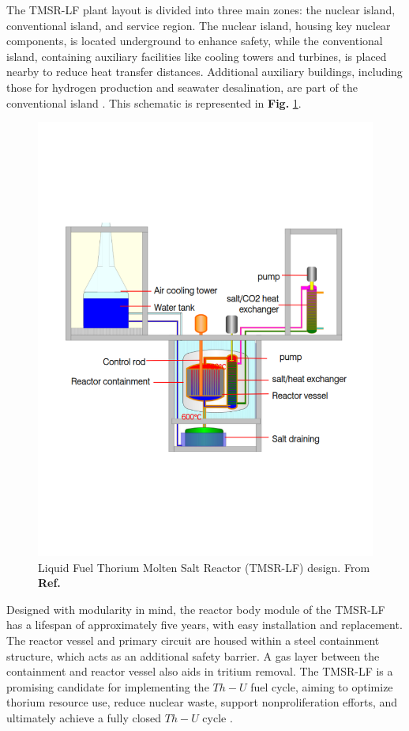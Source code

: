 The TMSR-LF plant layout is divided into three main zones: the nuclear island, conventional island, and service region. The nuclear island, housing key nuclear components, is located underground to enhance safety, while the conventional island, containing auxiliary facilities like cooling towers and turbines, is placed nearby to reduce heat transfer distances. Additional auxiliary buildings, including those for hydrogen production and seawater desalination, are part of the conventional island \cite{TMSR_book}. This schematic is represented in \textbf{Fig.} \ref{fig:TMSR-LF}.

\begin{figure}[ht]
    \centering
    \includegraphics[scale=0.5]{Kap6/Figures_Kap6/TMSR-LF_2.png}
    \caption{Liquid Fuel Thorium Molten Salt Reactor (TMSR-LF) design. From \textbf{Ref.} \cite{Xu2017}}
    \label{fig:TMSR-LF}    
\end{figure}

Designed with modularity in mind, the reactor body module of the TMSR-LF has a lifespan of approximately five years, with easy installation and replacement. The reactor vessel and primary circuit are housed within a steel containment structure, which acts as an additional safety barrier. A gas layer between the containment and reactor vessel also aids in tritium removal. The TMSR-LF is a promising candidate for implementing the \(Th-U\) fuel cycle, aiming to optimize thorium resource use, reduce nuclear waste, support nonproliferation efforts, and ultimately achieve a fully closed \(Th-U\) cycle \cite{TMSR_book}.

